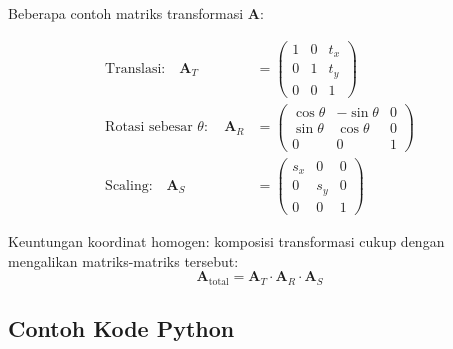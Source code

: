 \documentclass[12pt,a4paper]{article}
\begin{document}
\noindent Beberapa contoh matriks transformasi $\mathbf{A}$:
 
\begin{align}
  \text{Translasi:}\quad
  \mathbf{A}_T &=
  \begin{pmatrix} 1 & 0 & t_x \\ 0 & 1 & t_y \\ 0 & 0 & 1 \end{pmatrix}
  \label{eq:translation} \\[8pt]
  \text{Rotasi sebesar } \theta:\quad
  \mathbf{A}_R &=
  \begin{pmatrix} \cos\theta & -\sin\theta & 0 \\ \sin\theta & \cos\theta & 0 \\ 0 & 0 & 1 \end{pmatrix}
  \label{eq:rotation} \\[8pt]
  \text{Scaling:}\quad
  \mathbf{A}_S &=
  \begin{pmatrix} s_x & 0 & 0 \\ 0 & s_y & 0 \\ 0 & 0 & 1 \end{pmatrix}
  \label{eq:scaling}
\end{align}
 
\noindent Keuntungan koordinat homogen: komposisi transformasi cukup dengan
mengalikan matriks-matriks tersebut:
\[
  \mathbf{A}_{\text{total}} = \mathbf{A}_T \cdot \mathbf{A}_R \cdot \mathbf{A}_S
\]
 
\subsection{Contoh Kode Python}
 
\end{document}
